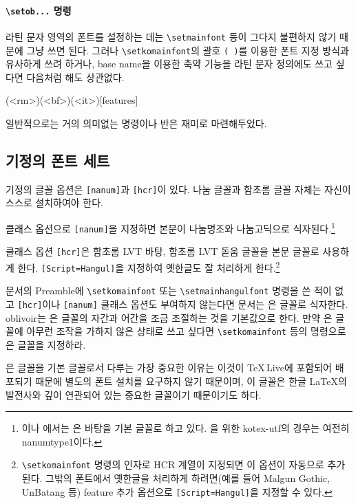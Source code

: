 \documentclass[
	12pt,
	a4paper,
	kosection,
	footnote,
	nobookmarks,
	microtype,
	figtabcapt,
]{oblivoir}
\def\cs#1{\texttt{\textbackslash #1}}
\def\ct#1{\texttt{#1}}
\begin{document}
\paragraph{\cs{setob...} 명령}

라틴 문자 영역의 폰트를 설정하는 데는 \cs{setmainfont} 등이 그다지 불편하지 않기 때문에
그냥 쓰면 된다. 그러나 \cs{setkomainfont}의 괄호 \ct{( )}를 이용한 폰트 지정 방식과
유사하게 쓰려 하거나, base name을 이용한 축약 기능을 라틴 문자 정의에도 쓰고 싶다면 다음처럼 해도 상관없다.
\begin{boxedverbatim}
(<rm>)(<bf>)(<it>)[features]
\end{boxedverbatim}
일반적으로는 거의 의미없는 명령이나 반은 재미로 마련해두었다.

\subsection{기정의 폰트 세트}

기정의 글꼴 옵션은 \texttt{[nanum]}과 \texttt{[hcr]}이 있다. 나눔 글꼴과 함초롬 글꼴
자체는 자신이 스스로 설치하여야 한다.

클래스 옵션으로 \texttt{[nanum]}을 지정하면 본문이 나눔명조와 나눔고딕으로 식자된다.\footnote{%
\XeTeX 이나 \LuaTeX 에서는 은 바탕을 기본 글꼴로 하고 있다. 을 위한
kotex-utf의 경우는 여전히 nanumtype1이다.}

클래스 옵션 \texttt{[hcr]}은 함초롬 LVT 바탕, 함초롬 LVT 돋움 글꼴을 본문 글꼴로 사용하게 한다.
\texttt{[Script=Hangul]}을 지정하여 옛한글도 잘 처리하게 한다.\footnote{%
	\cs{setkomainfont} 명령의 인자로 HCR 계열이 지정되면 이 옵션이 자동으로 추가된다.
	그밖의 폰트에서 옛한글을 처리하게 하려면(예를 들어 Malgun Gothic, UnBatang 등)
	feature 추가 옵션으로 \texttt{[Script=Hangul]}을 지정할 수 있다.}

문서의 Preamble에 \verb|\setkomainfont| 또는 \verb|\setmainhangulfont| 명령을 쓴 적이 없고 \texttt{[hcr]}이나 \texttt{[nanum]} 클래스 옵션도 부여하지 않는다면 문서는 은 글꼴로 식자한다. oblivoir는
은 글꼴의 자간과 어간을 조금 조절하는 것을 기본값으로 한다. 만약 은 글꼴에 아무런 
조작을 가하지 않은 상태로 쓰고 싶다면 \verb|\setkomainfont| 등의 명령으로 은 글꼴을
지정하라.

은 글꼴을 기본 글꼴로서 다루는 가장 중요한 이유는 이것이 \TeX\,Live에 포함되어 배포되기
때문에 별도의 폰트 설치를 요구하지 않기 때문이며, 이 글꼴은 한글 \LaTeX 의 발전사와
깊이 연관되어 있는 중요한 글꼴이기 때문이기도 하다.
\end{document}
